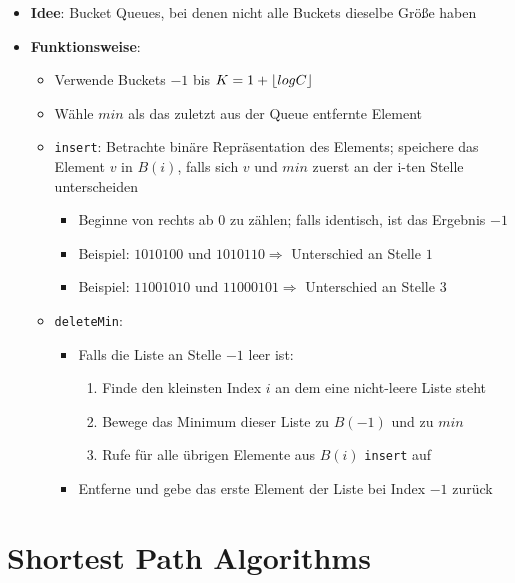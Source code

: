 \documentclass[10pt,a4paper]{article}
\DeclarePairedDelimiter{\floor}{\lfloor}{\rfloor}
\begin{document}
  	\begin{itemize}
  		\item \textbf{Idee}: Bucket Queues, bei denen nicht alle Buckets dieselbe Größe haben
  		\item \textbf{Funktionsweise}:
  		\begin{itemize}
  			\item Verwende Buckets $-1$ bis $K = 1 + \floor{log C}$
  			\item Wähle $min$ als das zuletzt aus der Queue entfernte Element
  			\item \texttt{insert}: Betrachte binäre Repräsentation des Elements; speichere das Element $v$ in $B(i)$, falls sich $v$ und $min$ zuerst an der i-ten Stelle unterscheiden
  			\begin{itemize}
  				\item Beginne von rechts ab $0$ zu zählen; falls identisch, ist das Ergebnis $-1$
  				\item Beispiel: $1010100$ und $1010110 \Rightarrow$ Unterschied an Stelle $1$
  				\item Beispiel: $11001010$ und $11000101 \Rightarrow$ Unterschied an Stelle $3$
  			\end{itemize}
  			\item \texttt{deleteMin}:
  			\begin{itemize}
  				\item Falls die Liste an Stelle $-1$ leer ist:
  				\begin{enumerate}
  					\item Finde den kleinsten Index $i$ an dem eine nicht-leere Liste steht
  					\item Bewege das Minimum dieser Liste zu $B(-1)$ und zu $min$
  					\item Rufe für alle übrigen Elemente aus $B(i)$ \texttt{insert} auf
  				\end{enumerate}
  				\item Entferne und gebe das erste Element der Liste bei Index $-1$ zurück
  			\end{itemize}
  		\end{itemize}
  	\end{itemize}

	\newpage
	\section{Shortest Path Algorithms}
	\label{sp:sec:shortest_path_algorithms}
	
\end{document}
